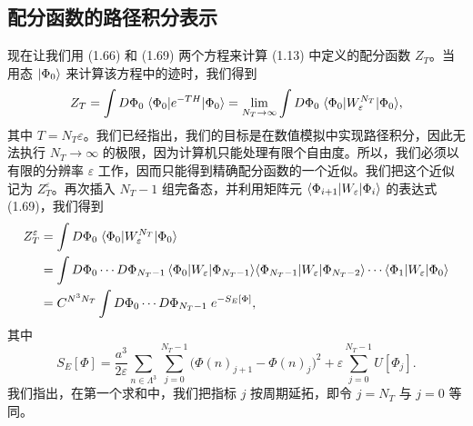 \subsection{配分函数的路径积分表示}

现在让我们用 (1.66) 和 (1.69) 两个方程来计算 (1.13) 中定义的配分函数 $Z_T$。当用态 $|\Phi_0\rangle$ 来计算该方程中的迹时，我们得到
\begin{equation}
  Z_T = \int D\Phi_0\;\langle\Phi_0|e^{-TH}|\Phi_0\rangle
  = \lim_{N_T\to\infty}\int D\Phi_0\;\langle\Phi_0|W_\varepsilon^{N_T}|\Phi_0\rangle,
\end{equation}
其中 $T = N_T\varepsilon$。我们已经指出，我们的目标是在数值模拟中实现路径积分，因此无法执行 $N_T \to \infty$ 的极限，因为计算机只能处理有限个自由度。所以，我们必须以有限的分辨率 $\varepsilon$ 工作，因而只能得到精确配分函数的一个近似。我们把这个近似记为 $Z_T^\varepsilon$。再次插入 $N_T - 1$ 组完备态，并利用矩阵元 $\langle\Phi_{i+1}|W_\varepsilon|\Phi_i\rangle$ 的表达式 (1.69)，我们得到
\begin{align}
  Z_T^\varepsilon &= \int D\Phi_0\;\langle\Phi_0|W_\varepsilon^{N_T}|\Phi_0\rangle \notag\\
  &= \int D\Phi_0\cdots D\Phi_{N_T-1}\,
     \langle\Phi_0|W_\varepsilon|\Phi_{N_T-1}\rangle
     \langle\Phi_{N_T-1}|W_\varepsilon|\Phi_{N_T-2}\rangle\cdots
     \langle\Phi_1|W_\varepsilon|\Phi_0\rangle \notag\\
  &= C^{N^3N_T}\int D\Phi_0\cdots D\Phi_{N_T-1}\;e^{-S_E[\Phi]},
\end{align}
其中
\begin{equation}
  S_E[\Phi] = \frac{a^3}{2\varepsilon}\sum_{n\in\Lambda^3}
    \sum_{j=0}^{N_T-1}\big(\Phi(n)_{j+1} - \Phi(n)_j\big)^2
    + \varepsilon\sum_{j=0}^{N_T-1}U[\Phi_j].
\end{equation}
我们指出，在第一个求和中，我们把指标 $j$ 按周期延拓，即令 $j = N_T$ 与 $j = 0$ 等同。

